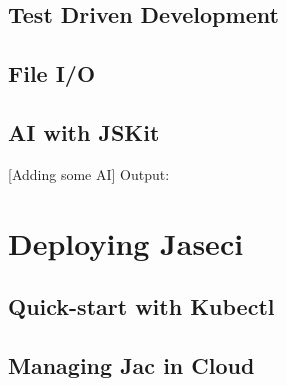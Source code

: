 \subsection{Test Driven Development}
\subsection{File I/O}

\subsection{AI with JSKit}
[Adding some AI]
Output:

\section{Deploying Jaseci}

\subsection{Quick-start with Kubectl}

\subsection{Managing Jac in Cloud}
